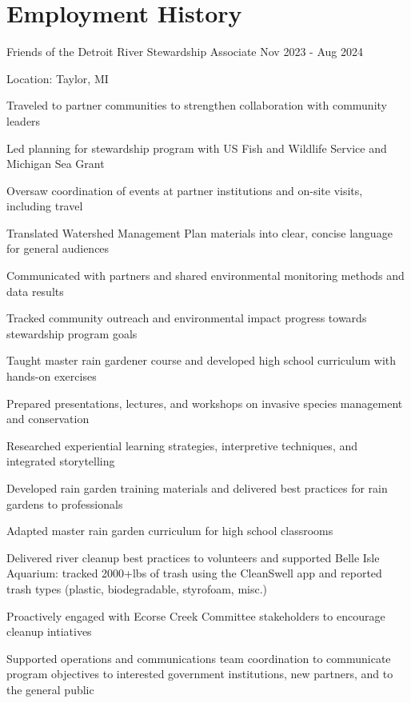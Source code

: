 \documentclass{../styles/cv}
\begin{document}
\section{Employment History}

\subsectionpositiondate
    {Friends of the Detroit River}
    {Stewardship Associate}
    {Nov 2023 - Aug 2024}
\resumesublistbegin
    \item Location: Taylor, MI
    \item Traveled to partner communities to strengthen collaboration with community leaders
    \item Led planning for stewardship program with US Fish and Wildlife Service and Michigan Sea Grant
    \item Oversaw coordination of events at partner institutions and on-site visits, including travel
    \item Translated Watershed Management Plan materials into clear, concise language for general audiences
    \item Communicated with partners and shared environmental monitoring methods and data results
    \item Tracked community outreach and environmental impact progress towards stewardship program goals
    \item Taught master rain gardener course and developed high school curriculum with hands-on exercises
    \item Prepared presentations, lectures, and workshops on invasive species management and conservation
    \item Researched experiential learning strategies, interpretive techniques, and integrated storytelling
    \item Developed rain garden training materials and delivered best practices for rain gardens to professionals
    \item Adapted master rain garden curriculum for high school classrooms
    \item Delivered river cleanup best practices to volunteers and supported Belle Isle Aquarium: tracked 2000+lbs of trash using the CleanSwell app and reported trash types (plastic, biodegradable, styrofoam, misc.)
    \item Proactively engaged with Ecorse Creek Committee stakeholders to encourage cleanup intiatives
    \item Supported operations and communications team coordination to communicate program objectives to interested government institutions, new partners, and to the general public
\end{document}
